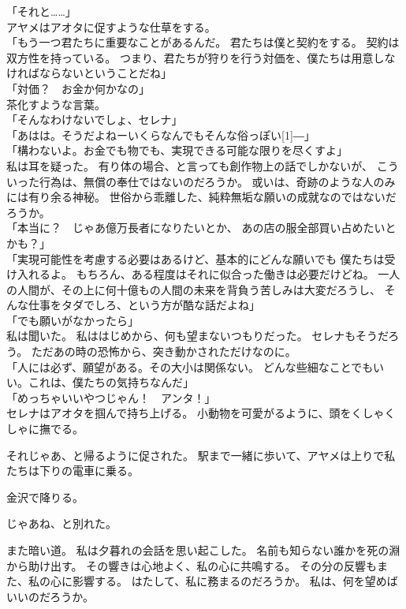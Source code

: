 \documentclass[../IHMain]{subfiles}
\begin{document}
「それと……」\\
アヤメはアオタに促すような仕草をする。\\
「もう一つ君たちに重要なことがあるんだ。
君たちは僕と契約をする。
契約は双方性を持っている。
つまり、君たちが狩りを行う対価を、僕たちは用意しなければならないということだね」\\
「対価？　お金か何かなの」\\
茶化すような言葉。\\
「そんなわけないでしょ、セレナ」\\
「あはは。そうだよねーいくらなんでもそんな俗っぽい\scalebox{3}[1]{―}」\\
「構わないよ。お金でも物でも、実現できる可能な限りを尽くすよ」\\
私は耳を疑った。
有り体の場合、と言っても創作物上の話でしかないが、
こういった行為は、無償の奉仕ではないのだろうか。
或いは、奇跡のような人のみには有り余る神秘。
世俗から乖離した、純粋無垢な願いの成就なのではないだろうか。\\
「本当に？　じゃあ億万長者になりたいとか、
あの店の服全部買い占めたいとかも？」\\
「実現可能性を考慮する必要はあるけど、基本的にどんな願いでも
僕たちは受け入れるよ。
もちろん、ある程度はそれに似合った働きは必要だけどね。
一人の人間が、その上に何十億もの人間の未来を背負う苦しみは大変だろうし、
そんな仕事をタダでしろ、という方が酷な話だよね」\\
「でも願いがなかったら」\\
私は聞いた。
私ははじめから、何も望まないつもりだった。
セレナもそうだろう。
ただあの時の恐怖から、突き動かされただけなのに。\\
「人には必ず、願望がある。その大小は関係ない。
どんな些細なことでもいい。これは、僕たちの気持ちなんだ」\\
「めっちゃいいやつじゃん！　アンタ！」\\
セレナはアオタを掴んで持ち上げる。
小動物を可愛がるように、頭をくしゃくしゃに撫でる。


それじゃあ、と帰るように促された。
駅まで一緒に歩いて、アヤメは上りで私たちは下りの電車に乗る。

金沢で降りる。

じゃあね、と別れた。

また暗い道。
私は夕暮れの会話を思い起こした。
名前も知らない誰かを死の淵から助け出す。
その響きは心地よく、私の心に共鳴する。
その分の反響もまた、私の心に影響する。
はたして、私に務まるのだろうか。
私は、何を望めばいいのだろうか。
\end{document}
